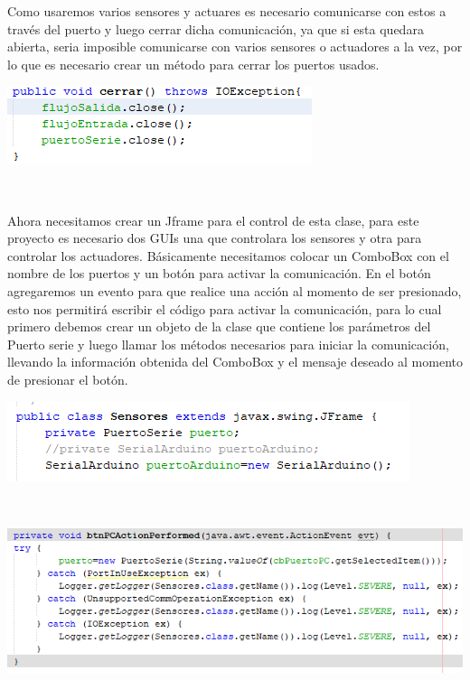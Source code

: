 \documentclass[letterpaper, 10 pt, conference]{ieeeconf}
\begin{document}
Como usaremos varios sensores y actuares es necesario comunicarse con estos a través del puerto y luego cerrar dicha comunicación, ya que si esta quedara abierta, seria imposible comunicarse con varios sensores o actuadores a la vez, por lo que es necesario crear un método para cerrar los puertos usados.
\begin{center}
\includegraphics[scale=0.94]{Documento/Figuras/5.PNG}
\begin{scriptsize}
\\ 
\end{scriptsize}
\end{center}
Ahora necesitamos crear un Jframe para el control de esta clase, para este proyecto es necesario dos GUIs una que controlara los sensores y otra para controlar los actuadores.
Básicamente necesitamos colocar un ComboBox con el nombre de los puertos y un botón para activar la comunicación.
En el botón agregaremos un evento para que realice una acción al momento de ser presionado, esto nos permitirá escribir el código para activar la comunicación, para lo cual primero debemos crear un objeto de la clase que contiene los parámetros del Puerto serie y luego llamar los métodos necesarios para iniciar la comunicación, llevando la información obtenida del ComboBox y el mensaje deseado al momento de presionar el botón.
\begin{center}
\includegraphics[scale=0.7]{Documento/Figuras/6.PNG}
\begin{scriptsize}
\\ 
\end{scriptsize}
\end{center}
\begin{center}
\includegraphics[scale=0.45]{Documento/Figuras/7.PNG}
\begin{scriptsize}
\\ 
\end{scriptsize}
\end{center}
\end{document}
